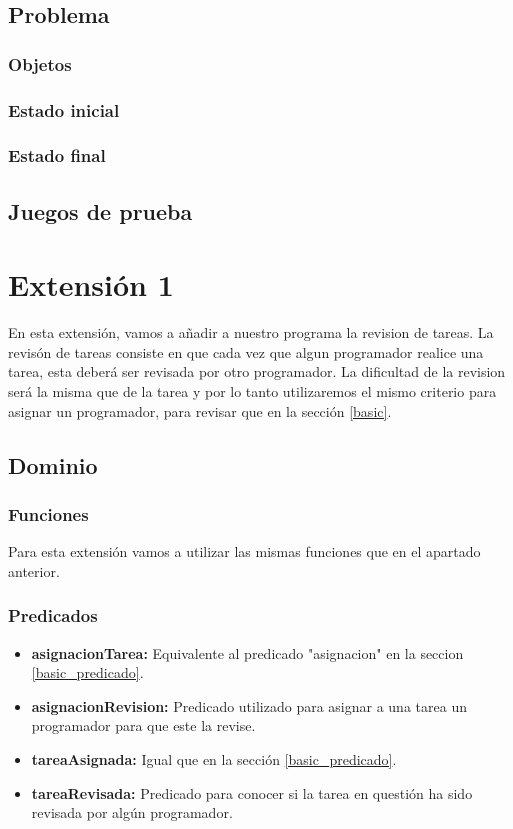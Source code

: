 \documentclass[12pt]{article}
\begin{document}
\subsection{Problema}
\subsubsection{Objetos}
\subsubsection{Estado inicial} \label{basic_estadoinicial}
\subsubsection{Estado final}

\subsection{Juegos de prueba}


\section{Extensión 1}

En esta extensión, vamos a añadir a nuestro programa la revision de tareas.
La revisón de tareas consiste en que cada vez que algun programador realice una tarea, esta deberá ser revisada por otro programador. La dificultad de la revision será la misma que de la tarea y por lo tanto utilizaremos el mismo criterio para asignar un programador, para revisar que en la sección \ref{basic}.

\subsection{Dominio}
\subsubsection{Funciones}

Para esta extensión vamos a utilizar las mismas funciones que en el apartado anterior.

\subsubsection{Predicados}

\begin{itemize}
  \item \textbf{asignacionTarea:} Equivalente al predicado "asignacion" en la seccion \ref{basic_predicado}.
  \item \textbf{asignacionRevision:} Predicado utilizado para asignar a una tarea un programador para que este la revise. 
  \item \textbf{tareaAsignada:} Igual que en la sección \ref{basic_predicado}.
  \item \textbf{tareaRevisada:} Predicado para conocer si la tarea en questión ha sido revisada por algún programador.
\end{itemize}
\end{document}
